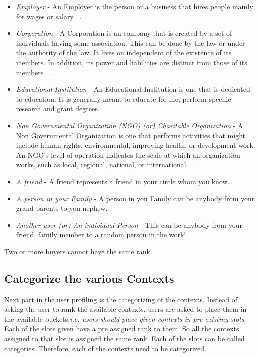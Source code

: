 \begin{itemize}
\item {\it Employer} - An Employer is the person or a business that hires people mainly for wages or salary ~\cite{employerdict}.
\item {\it Corporation} - A Corporation is an company that is created by a set of
individuals having some association. This can be done by the law or under the authority of the law. It lives on independent of the 
existence of its members. In addition, its power and liabilities are distinct from those of its members ~\cite{corporationdict}.
\item {\it Educational Institution} - An Educational Institution is one that is dedicated to education. It is generally meant to educate for life, perform
specific research and grant degrees.
\item {\it Non Governmental Organization (NGO) (or) Charitable Organization} - A Non Governmental Organization is one that performs activities that might include human rights, environmental, improving health, or development work. An NGO's level of operation indicates the scale at which an organization works, such as local, regional, national, or international ~\cite{ngointro}.
\item {\it A friend} - A friend represents a friend in your circle whom you know.
\item {\it A person in your Family} - A person in you Family can be anybody from your grand-parents to you nephew.
\item {\it Another user (or) An individual Person} - This can be anybody from your friend, family member to a random person in the world.

\end{itemize}

Two or more buyers cannot have the same rank.

\subsection{Categorize the various Contexts}

Next part in the user profiling is the categorizing of the contexts. Instead of asking the user to rank the available contexts, users are asked to
place them in the available buckets,{\it i.e. users should place given contexts in pre existing slots}. Each of the slots given have a pre assigned rank to them. So all the contexts assigned to that slot is assigned the same rank. Each of the slots can be called categories. Therefore, each of the
contexts need to be categorized.

